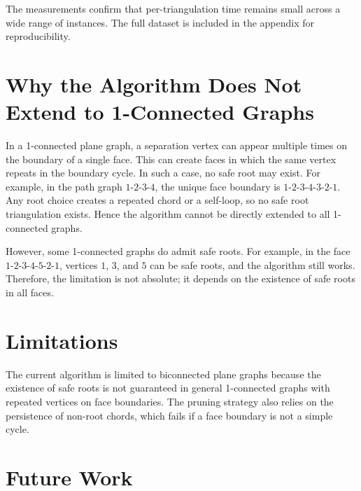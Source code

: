\documentclass[12pt,a4paper]{report}
\theoremstyle{definition}
\theoremstyle{remark}
\begin{document}
The measurements confirm that per-triangulation time remains small across a wide range of
instances. The full dataset is included in the appendix for reproducibility.

\chapter{Why the Algorithm Does Not Extend to 1-Connected Graphs}
\label{chap:limitations}

In a 1-connected plane graph, a separation vertex can appear multiple times on the
boundary of a single face. This can create faces in which the same vertex repeats in the
boundary cycle. In such a case, no safe root may exist. For example, in the path graph
$1$-$2$-$3$-$4$, the unique face boundary is $1$-$2$-$3$-$4$-$3$-$2$-$1$. Any root
choice creates a repeated chord or a self-loop, so no safe root triangulation exists.
Hence the algorithm cannot be directly extended to all 1-connected graphs.

However, some 1-connected graphs do admit safe roots. For example, in the face
$1$-$2$-$3$-$4$-$5$-$2$-$1$, vertices $1$, $3$, and $5$ can be safe roots, and the
algorithm still works. Therefore, the limitation is not absolute; it depends on the
existence of safe roots in all faces.

\chapter{Limitations}

The current algorithm is limited to biconnected plane graphs because the existence of
safe roots is not guaranteed in general 1-connected graphs with repeated vertices on face
boundaries. The pruning strategy also relies on the persistence of non-root chords, which
fails if a face boundary is not a simple cycle.

\chapter{Future Work}
\label{chap:futurework}
\end{document}
